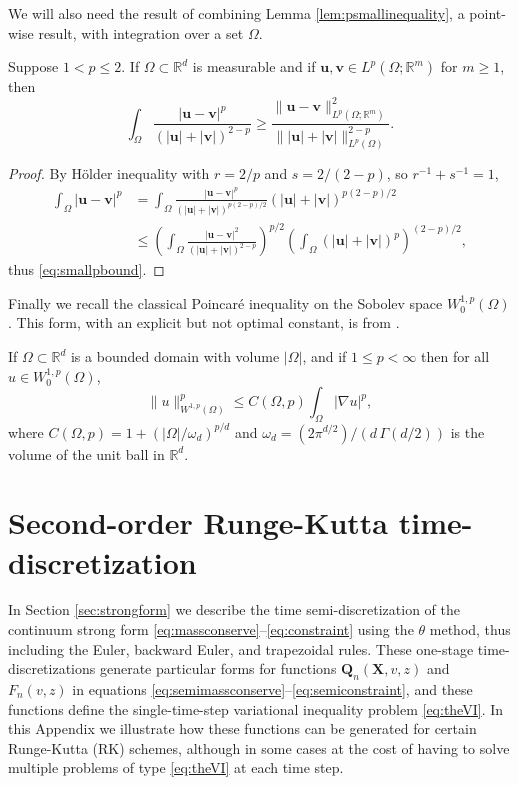 \documentclass[final,leqno,onefignum,onetabnum]{siamltex1213bueler}
\newcommand\bu{\mathbf{u}}
\newcommand\bv{\mathbf{v}}
\newcommand\bQ{\mathbf{Q}}
\newcommand\bX{\mathbf{X}}
\renewcommand{\grad}{\nabla}
\newcommand\RR{\mathbb{R}}
\begin{document}
We will also need the result of combining Lemma \ref{lem:psmallinequality}, a point-wise result, with integration over a set $\Omega$.

\begin{lemma} \label{lem:smallpbound}  Suppose $1<p\le 2$.  If $\Omega \subset \RR^d$ is measurable and if $\bu,\bv\in L^p(\Omega; \RR^m)$ for $m\ge 1$, then
\begin{equation}
    \int_\Omega \frac{|\bu-\bv|^p}{\left(|\bu|+|\bv|\right)^{2-p}} \ge \frac{\|\bu-\bv\|_{L^p(\Omega; \RR^m)}^2}{\big\||\bu|+|\bv|\big\|_{L^p(\Omega)}^{2-p}}. \label{eq:smallpbound}
\end{equation}
\end{lemma}

\begin{proof}  By H\"older inequality with $r=2/p$ and $s=2/(2-p)$, so $r^{-1}+s^{-1}=1$,
\begin{align*}
\int_\Omega |\bu - \bv|^p &= \int_\Omega \frac{|\bu-\bv|^p}{\left(|\bu|+|\bv|\right)^{p(2-p)/2}} \left(|\bu|+|\bv|\right)^{p(2-p)/2} \\
    &\le \left(\int_\Omega \frac{|\bu-\bv|^2}{\left(|\bu|+|\bv|\right)^{2-p}}\right)^{p/2} \left(\int_\Omega \left(|\bu|+|\bv|\right)^p\right)^{(2-p)/2},
\end{align*}
thus \eqref{eq:smallpbound}.
\end{proof}

Finally we recall the classical Poincar\'e inequality on the Sobolev space $W_0^{1,p}(\Omega)$.  This form, with an explicit but not optimal constant, is from \cite[section 7.8]{GilbargTrudinger2001}.

\begin{lemma} \label{lem:poincare}  If $\Omega\subset \RR^d$ is a bounded domain with volume $|\Omega|$, and if $1\le p<\infty$ then for all $u\in W_0^{1,p}(\Omega)$,
\begin{equation}
  \|u\|_{W^{1,p}(\Omega)}^p \le C(\Omega,p) \int_\Omega |\grad u|^p, \label{eq:poincare}
\end{equation}
where $C(\Omega,p)=1+(|\Omega|/\omega_d)^{p/d}$ and $\omega_d=(2 \pi^{d/2})/(d\,\Gamma(d/2))$ is the volume of the unit ball in $\RR^d$.
\end{lemma}


\section{Second-order Runge-Kutta time-discretization}   \label{app:rk2}  In Section \ref{sec:strongform} we describe the time semi-discretization of the continuum strong form \eqref{eq:massconserve}--\eqref{eq:constraint} using the $\theta$ method, thus including the Euler, backward Euler, and trapezoidal rules.  These one-stage time-discretizations generate particular forms for functions $\bQ_n(\bX,v,z)$ and $F_n(v,z)$ in equations \eqref{eq:semimassconserve}--\eqref{eq:semiconstraint}, and these functions define the single-time-step variational inequality problem \eqref{eq:theVI}.  In this Appendix we illustrate how these functions can be generated for certain Runge-Kutta (RK) schemes, although in some cases at the cost of having to solve multiple problems of type \eqref{eq:theVI} at each time step.
\end{document}
